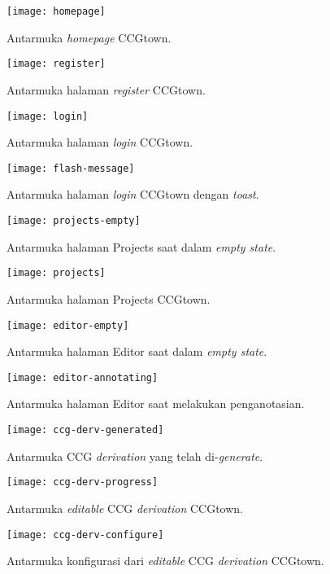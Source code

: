 \begin{figure}[b]\centering
  \texttt{[image: homepage]}
  \caption{Antarmuka \textit{homepage} CCGtown.}
  \label{ui:homepage}
\end{figure}

\begin{figure}\centering
  \texttt{[image: register]}
  \caption{Antarmuka halaman \textit{register} CCGtown.}
  \label{ui:register}
\end{figure}

\begin{figure}\centering
  \texttt{[image: login]}
  \caption{Antarmuka halaman \textit{login} CCGtown.}
  \label{ui:login}
\end{figure}

\begin{figure}\centering
  \texttt{[image: flash-message]}
  \caption{Antarmuka halaman \textit{login} CCGtown dengan \textit{toast}.}
  \label{ui:flash-message}
\end{figure}

\begin{figure}\centering
  \texttt{[image: projects-empty]}
  \caption{Antarmuka halaman Projects saat dalam \textit{empty state}.}
  \label{ui:projects-empty}
\end{figure}

\begin{figure}\centering
  \texttt{[image: projects]}
  \caption{Antarmuka halaman Projects CCGtown.}
  \label{ui:projects}
\end{figure}

\begin{figure}\centering
  \texttt{[image: editor-empty]}
  \caption{Antarmuka halaman Editor saat dalam \textit{empty state}.}
  \label{ui:editor-empty}
\end{figure}

\begin{figure}\centering
  \texttt{[image: editor-annotating]}
  \caption{Antarmuka halaman Editor saat melakukan penganotasian.}
  \label{ui:editor-annotating}
\end{figure}

\begin{figure}\centering
  \texttt{[image: ccg-derv-generated]}
  \caption{Antarmuka CCG \textit{derivation} yang telah di-\textit{generate}.}
  \label{ui:deriv-generated}
\end{figure}

\begin{figure}\centering
  \texttt{[image: ccg-derv-progress]}
  \caption{Antarmuka \textit{editable} CCG \textit{derivation} CCGtown.}
  \label{ui:deriv-progress}
\end{figure}

\begin{figure}\centering
  \texttt{[image: ccg-derv-configure]}
  \caption{Antarmuka konfigurasi dari \textit{editable} CCG \textit{derivation} CCGtown.}
  \label{ui:deriv-configure}
\end{figure}
